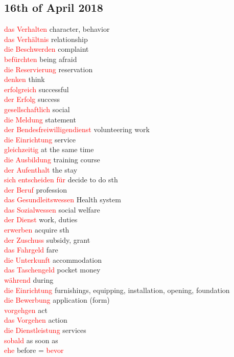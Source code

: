 \documentclass{article}
\begin{document}
\begin{multicols}{2}
	\section*{16th of April 2018}
	\textcolor{red}{das Verhalten} character, behavior\\
	\textcolor{red}{das Verhältnis} relationship\\
	\textcolor{red}{die Beschwerden} complaint\\
	\textcolor{red}{befürchten} being afraid\\
	\textcolor{red}{die Reservierung} reservation\\
	\textcolor{red}{denken} think\\
	\textcolor{red}{erfolgreich} successful\\
	\textcolor{red}{der Erfolg} success\\
	\textcolor{red}{gesellschaftlich} social\\
	\textcolor{red}{die Meldung} statement\\
	\textcolor{red}{der Bendesfreiwilligendienst} volunteering work \\
	\textcolor{red}{die Einrichtung} service \\
	\textcolor{red}{gleichzeitig} at the same time\\
	\textcolor{red}{die Ausbildung} training course\\
	\textcolor{red}{der Aufenthalt} the stay\\
	\textcolor{red}{sich entscheiden für} decide to do sth\\
	\textcolor{red}{der Beruf} profession\\
	\textcolor{red}{das Gesundleitswessen} Health system \\
	\textcolor{red}{das Sozialwessen} social welfare\\
	\textcolor{red}{der Dienst} work, duties\\ 
	\textcolor{red}{erwerben} acquire sth\\
	\textcolor{red}{der Zuschuss} subsidy, grant\\
	\textcolor{red}{das Fahrgeld} fare\\ 
	\textcolor{red}{die Unterkunft} accommodation\\
	\textcolor{red}{das Taschengeld} pocket money\\
	\textcolor{red}{während} during\\
	\textcolor{red}{die Einrichtung} furnishings, equipping, installation, opening, foundation\\
	\textcolor{red}{die Bewerbung} application (form)\\
	\textcolor{red}{vorgehgen} act \\
	\textcolor{red}{das Vorgehen} action\\
	\textcolor{red}{die Dienstleistung} services\\
	\textcolor{red}{sobald} as soon as\\
	\textcolor{red}{ehe} before = \textcolor{red}{bevor} \\
	

\end{multicols}
\end{document}
